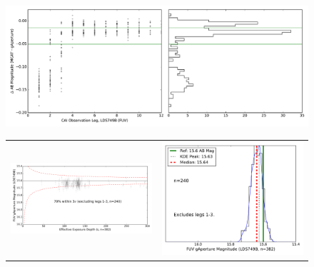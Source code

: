 \documentclass[preprint]{aastex}
\begin{document}
\clearpage
\begin{figure}[h]
\includegraphics[scale=0.475]{Fig09a.pdf}\\
\begin{tabular}{cc}
\includegraphics[scale=0.325]{Fig09b.pdf}&
\includegraphics[scale=0.325]{Fig09c.pdf}\\
\end{tabular}

\end{figure}
\end{document}
